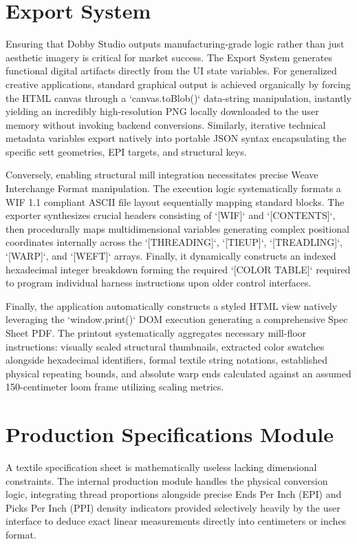 \section{Export System}
Ensuring that Dobby Studio outputs manufacturing-grade logic rather than just aesthetic imagery is critical for market success. The Export System generates functional digital artifacts directly from the UI state variables. For generalized creative applications, standard graphical output is achieved organically by forcing the HTML canvas through a `canvas.toBlob()` data-string manipulation, instantly yielding an incredibly high-resolution PNG locally downloaded to the user memory without invoking backend conversions. Similarly, iterative technical metadata variables export natively into portable JSON syntax encapsulating the specific sett geometries, EPI targets, and structural keys.

Conversely, enabling structural mill integration necessitates precise Weave Interchange Format manipulation. The execution logic systematically formats a WIF 1.1 compliant ASCII file layout sequentially mapping standard blocks. The exporter synthesizes crucial headers consisting of `[WIF]` and `[CONTENTS]`, then procedurally maps multidimensional variables generating complex positional coordinates internally across the `[THREADING]`, `[TIEUP]`, `[TREADLING]`, `[WARP]`, and `[WEFT]` arrays. Finally, it dynamically constructs an indexed hexadecimal integer breakdown forming the required `[COLOR TABLE]` required to program individual harness instructions upon older control interfaces.

Finally, the application automatically constructs a styled HTML view natively leveraging the `window.print()` DOM execution generating a comprehensive Spec Sheet PDF. The printout systematically aggregates necessary mill-floor instructions: visually scaled structural thumbnails, extracted color swatches alongside hexadecimal identifiers, formal textile string notations, established physical repeating bounds, and absolute warp ends calculated against an assumed 150-centimeter loom frame utilizing scaling metrics.

\section{Production Specifications Module}
A textile specification sheet is mathematically useless lacking dimensional constraints. The internal production module handles the physical conversion logic, integrating thread proportions alongside precise Ends Per Inch (EPI) and Picks Per Inch (PPI) density indicators provided selectively heavily by the user interface to deduce exact linear measurements directly into centimeters or inches format. 

